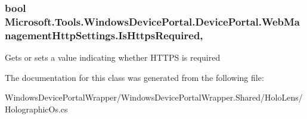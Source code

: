 \subsubsection[{\texorpdfstring{Is\+Https\+Required}{IsHttpsRequired}}]{\setlength{\rightskip}{0pt plus 5cm}bool Microsoft.\+Tools.\+Windows\+Device\+Portal.\+Device\+Portal.\+Web\+Management\+Http\+Settings.\+Is\+Https\+Required\hspace{0.3cm}{\ttfamily [get]}, {\ttfamily [set]}}\hypertarget{class_microsoft_1_1_tools_1_1_windows_device_portal_1_1_device_portal_1_1_web_management_http_settings_a0b2e255bad26460f977010fda3aacaf2}{}\label{class_microsoft_1_1_tools_1_1_windows_device_portal_1_1_device_portal_1_1_web_management_http_settings_a0b2e255bad26460f977010fda3aacaf2}


Gets or sets a value indicating whether H\+T\+T\+PS is required 



The documentation for this class was generated from the following file\+:\begin{DoxyCompactItemize}
\item 
Windows\+Device\+Portal\+Wrapper/\+Windows\+Device\+Portal\+Wrapper.\+Shared/\+Holo\+Lens/Holographic\+Os.\+cs\end{DoxyCompactItemize}
